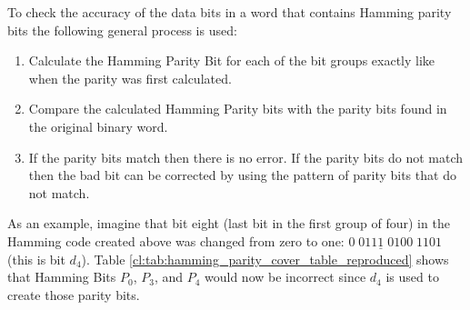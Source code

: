 To check the accuracy of the data bits in a word that contains Hamming parity bits the following general process is used:

\begin{enumerate}
  \item Calculate the Hamming Parity Bit for each of the bit groups exactly like when the parity was first calculated.
  \item Compare the calculated Hamming Parity bits with the parity bits found in the original binary word.
  \item If the parity bits match then there is no error. If the parity bits do not match then the bad bit can be corrected by using the pattern of parity bits that do not match.
\end{enumerate}

As an example, imagine that bit eight (last bit in the first group of four) in the Hamming code created above was changed from zero to one: $ 0 \; 011\underline{1} \; 0100 \; 1101 $ (this is bit $ d_4 $).  Table \ref{cl:tab:hamming_parity_cover_table_reproduced} shows that Hamming Bits $ P_0 $, $ P_3 $, and $ P_4 $ would now be incorrect since $ d_4 $ is used to create those parity bits.


